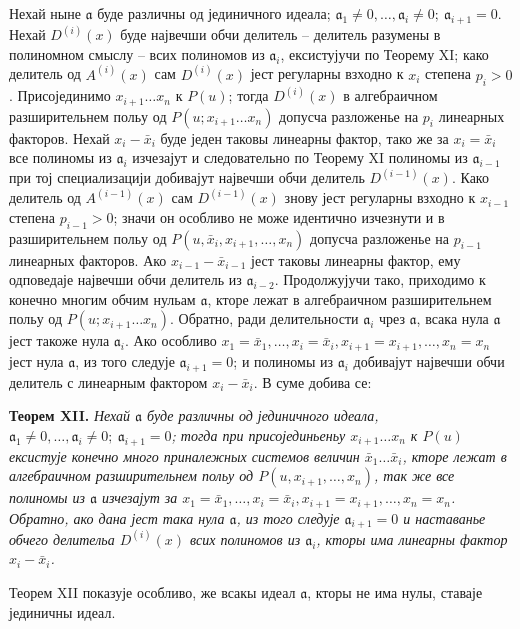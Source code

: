 \documentclass[11pt]{article}
\providecommand{\aideal}{\mathfrak a}
\begin{document}
Нехай ныне $\aideal$ буде различны од јединичного идеала; $\aideal_1\ne0,\ldots,\aideal_i\ne0;\ \aideal_{i+1}=0$. Нехай $D^{(i)}(x)$ буде највечши обчи делитель -- делитель разумены в полиномном смыслу -- всих полиномов из $\aideal_i$, ексистујучи по Теорему XI; како делитель од $A^{(i)}(x)$ сам $D^{(i)}(x)$ јест регуларны взходно к $x_i$ степена $p_i>0$. Присојединимо $x_{i+1}\ldots x_n$ к $P(u)$; тогда $D^{(i)}(x)$ в алгебраичном разширительнем польу од $P(u;x_{i+1}\ldots x_n)$ допусча разложенье на $p_i$ линеарных факторов. Нехай $x_i-\bar x_i$ буде једен таковы линеарны фактор, тако же за $x_i=\bar x_i$ все полиномы из $\aideal_i$ изчезајут и следовательно по Теорему XI полиномы из $\aideal_{i-1}$ при тој специализацији добивајут највечши обчи делитель $D^{(i-1)}(x)$. Како делитель од $A^{(i-1)}(x)$ сам $D^{(i-1)}(x)$ знову јест регуларны взходно к $x_{i-1}$ степена $p_{i-1}>0$; значи он особливо не може идентично изчезнути и в разширительнем польу од $P(u,\bar x_i,x_{i+1},\ldots,x_n)$ допусча разложенье на $p_{i-1}$ линеарных факторов. Ако $x_{i-1}-\bar x_{i-1}$ јест таковы линеарны фактор, ему одповедаје највечши обчи делитель из $\aideal_{i-2}$. Продолжујучи тако, приходимо к конечно многим обчим нульам $\aideal$, кторе лежат в алгебраичном разширительнем польу од $P(u;x_{i+1}\ldots x_n)$. Обратно, ради делительности $\aideal_i$ чрез $\aideal$, всака нула $\aideal$ јест такоже нула $\aideal_i$. Ако особливо $x_1=\bar x_1,\ldots,x_i=\bar x_i,x_{i+1}=x_{i+1},\ldots,x_n=x_n$ јест нула $\aideal$, из того следује $\aideal_{i+1}=0$; и полиномы из $\aideal_i$ добивајут највечши обчи делитель с линеарным фактором $x_i-\bar x_i$. В суме добива се:

\medskip
\noindent\textbf{Теорем XII.} {\itshape Нехай $\aideal$ буде различны од јединичного идеала, $\aideal_1\ne0,\ldots,\aideal_i\ne0;\ \aideal_{i+1}=0$; тогда при присојединьеньу $x_{i+1}\ldots x_n$ к $P(u)$ ексистује конечно много приналежных системов величин $\bar x_1\ldots\bar x_i$, кторе лежат в алгебраичном разширительнем польу од $P(u,x_{i+1},\ldots,x_n)$, так же все полиномы из $\aideal$ изчезајут за $x_1=\bar x_1,\ldots,x_i=\bar x_i,x_{i+1}=x_{i+1},\ldots,x_n=x_n$. Обратно, ако дана јест така нула $\aideal$, из того следује $\aideal_{i+1}=0$ и наставанье обчего делительа $D^{(i)}(x)$ всих полиномов из $\aideal_i$, кторы има линеарны фактор $x_i-\bar x_i$.}

Теорем XII показује особливо, же всакы идеал $\aideal$, кторы не има нулы, ставаје јединичны идеал.
\end{document}
